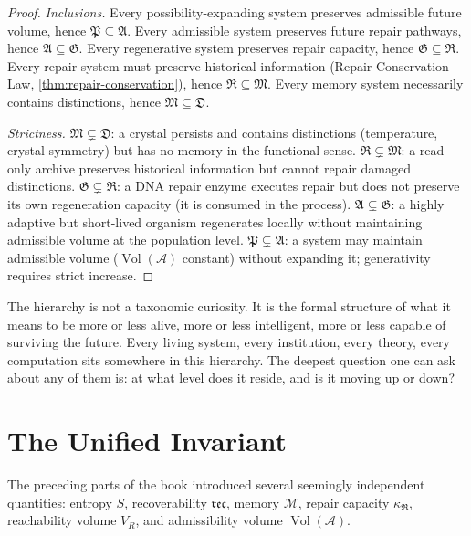 \documentclass[12pt,twoside,openright]{book}
\newcommand{\adm}{\mathcal{A}}
\newcommand{\repair}{\mathfrak{R}}
\newcommand{\reco}{\mathfrak{rec}}
\newcommand{\Vol}{\operatorname{Vol}}
\begin{document}
\begin{proof}
  \textit{Inclusions.}
  Every possibility-expanding system preserves admissible
  future volume, hence $\mathfrak{P} \subseteq \mathfrak{A}$.
  Every admissible system preserves future repair pathways,
  hence $\mathfrak{A} \subseteq \mathfrak{G}$.
  Every regenerative system preserves repair capacity,
  hence $\mathfrak{G} \subseteq \mathfrak{R}$.
  Every repair system must preserve historical information
  (Repair Conservation Law, \cref{thm:repair-conservation}),
  hence $\mathfrak{R} \subseteq \mathfrak{M}$.
  Every memory system necessarily contains distinctions,
  hence $\mathfrak{M} \subseteq \mathfrak{D}$.

  \textit{Strictness.}
  $\mathfrak{M} \subsetneq \mathfrak{D}$:
  a crystal persists and contains distinctions (temperature,
  crystal symmetry) but has no memory in the functional sense.
  $\mathfrak{R} \subsetneq \mathfrak{M}$:
  a read-only archive preserves historical information but
  cannot repair damaged distinctions.
  $\mathfrak{G} \subsetneq \mathfrak{R}$:
  a DNA repair enzyme executes repair but does not
  preserve its own regeneration capacity
  (it is consumed in the process).
  $\mathfrak{A} \subsetneq \mathfrak{G}$:
  a highly adaptive but short-lived organism regenerates
  locally without maintaining admissible volume
  at the population level.
  $\mathfrak{P} \subsetneq \mathfrak{A}$:
  a system may maintain admissible volume ($\Vol(\adm)$
  constant) without expanding it; generativity requires
  strict increase.
\end{proof}

\noindent
The hierarchy is not a taxonomic curiosity. It is the
formal structure of what it means to be more or less
alive, more or less intelligent, more or less capable
of surviving the future. Every living system,
every institution, every theory, every computation
sits somewhere in this hierarchy. The deepest question
one can ask about any of them is: at what level does it
reside, and is it moving up or down?

\section{The Unified Invariant}
\label{sec:ch30-unified}

The preceding parts of the book introduced several
seemingly independent quantities:
entropy $S$, recoverability $\reco$, memory $\mathcal{M}$,
repair capacity $\kappa_\repair$, reachability volume $V_R$,
and admissibility volume $\Vol(\adm)$.
\end{document}
